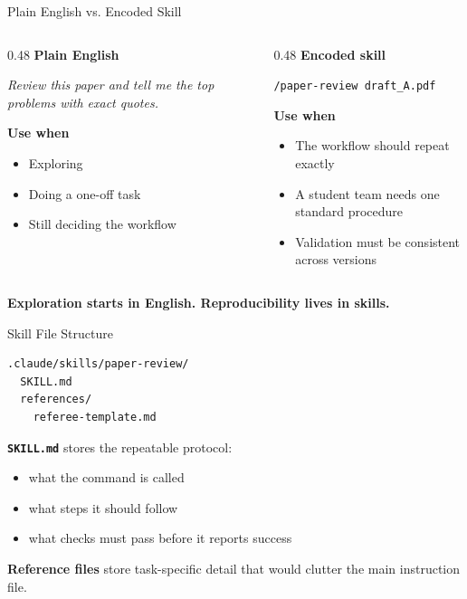 \documentclass[10pt,english,aspectratio=169]{beamer}
\begin{document}
\begin{frame}{Plain English vs. Encoded Skill}
\begin{columns}[T]
\begin{column}{0.48\textwidth}
\textbf{Plain English}

\vspace{0.15cm}
\textit{Review this paper and tell me the top problems with exact quotes.}

\vspace{0.2cm}
\textbf{Use when}
\begin{itemize}
    \item Exploring
    \item Doing a one-off task
    \item Still deciding the workflow
\end{itemize}
\end{column}
\begin{column}{0.48\textwidth}
\textbf{Encoded skill}

\vspace{0.15cm}
\texttt{/paper-review draft\_A.pdf}

\vspace{0.2cm}
\textbf{Use when}
\begin{itemize}
    \item The workflow should repeat exactly
    \item A student team needs one standard procedure
    \item Validation must be consistent across versions
\end{itemize}
\end{column}
\end{columns}

\vspace{0.25cm}

\textbf{Exploration starts in English. Reproducibility lives in skills.}
\end{frame}

\begin{frame}[fragile]{Skill File Structure}
\begin{lstlisting}[style=pythonstyle,language={},basicstyle=\ttfamily\tiny,numbers=none]
.claude/skills/paper-review/
  SKILL.md
  references/
    referee-template.md
\end{lstlisting}

\vspace{0.2cm}

\textbf{\texttt{SKILL.md}} stores the repeatable protocol:
\begin{itemize}
    \item what the command is called
    \item what steps it should follow
    \item what checks must pass before it reports success
\end{itemize}

\vspace{0.2cm}

\textbf{Reference files} store task-specific detail that would clutter the main instruction file.
\end{frame}
\end{document}
